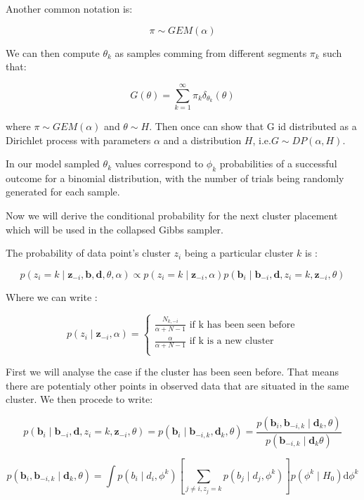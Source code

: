 \documentclass[]{article}
\begin{document}
	Another common notation is:
	
	$$ \pi \sim GEM(\alpha) $$
	
	We can then compute $\theta_k$ as samples comming from different segments $\pi_k$ such that:
	
	$$ G(\theta) = \sum_{k=1}^{\infty} \pi_k \delta_{\theta_k}(\theta) $$
	
	where $\pi \sim GEM(\alpha)$ and $\theta \sim H$. Then once can show that G id distributed as a Dirichlet process with parameters $\alpha$ and a distribution $H$, i.e.$G \sim DP(\alpha,H)$.
	
	In our model sampled $\theta_k$ values correspond to $\phi_k$ probabilities of a successful outcome for a binomial distribution, with the number of trials being randomly generated for each sample. 
	
	Now we will derive the conditional probability for the next cluster placement which will be used in the collapsed Gibbs sampler.
	
	The probability of data point's cluster $z_i$ being a particular cluster $k$ is :
	
	$$ p(z_i = k \mid \mathbf{z}_{-i}, \mathbf{b}, \mathbf{d}, \theta, \alpha) \propto p(z_i = k \mid \mathbf{z}_{-i},\alpha) p(\mathbf{b}_i \mid \mathbf{b}_{-i}, \mathbf{d}, z_i = k, \mathbf{z}_{-i}, \theta ) $$
	
	Where we can write :
	
	$$ p(z_i \mid \mathbf{z}_{-i}, \alpha) = 
	\begin{cases}
	\frac{N_{k,-i}}{\alpha + N -1} \text{ if k has been seen before}\\
	\frac{\alpha}{\alpha + N -1} \text{ if k is a new cluster}\\
	\end{cases} $$
	
	
	First we will analyse the case if the cluster has been seen before. That means there are potentialy other points in observed data that are situated in the same cluster. We then procede to write:
	
	$$ p(\mathbf{b}_i \mid \mathbf{b}_{-i},\mathbf{d}, z_i = k, \mathbf{z}_{-i}, \theta ) = p(\mathbf{b}_i \mid \mathbf{b}_{-i,k}, \mathbf{d}_k, \theta ) = \frac{p(\mathbf{b}_i,\mathbf{b}_{-i,k} \mid \mathbf{d}_k,\theta )}{p( \mathbf{b}_{-i,k} \mid \mathbf{d}_k \theta )} $$ 
	
	$$ p(\mathbf{b}_i,\mathbf{b}_{-i,k} \mid \mathbf{d}_k,\theta ) = \int p(b_i\mid d_i,\phi^k) \left[ \sum_{j \neq i, z_j=k} p(b_j\mid d_j,\phi^k) \right] p(\phi^k \mid H_0) \text{d} \phi^k$$ 
	
\end{document}
